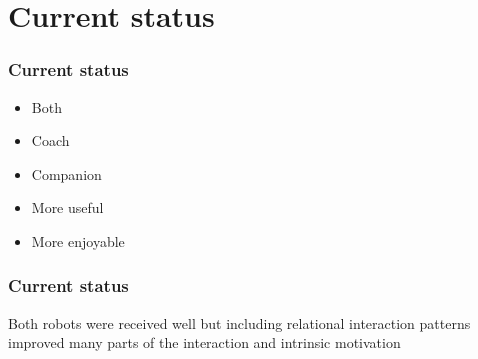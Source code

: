 \documentclass{beamer}
\begin{document}
\section{Current status}

\begin{frame}
  \frametitle{Current status}

  \begin{itemize}
    \item Both 
    \item Coach
    \item Companion
    \item More useful
    \item More enjoyable
  \end{itemize}
\end{frame}

\begin{frame}
 \frametitle{Current status}

Both robots were received well but including relational interaction patterns improved many parts of the interaction and intrinsic motivation
\end{frame}
\end{document}
